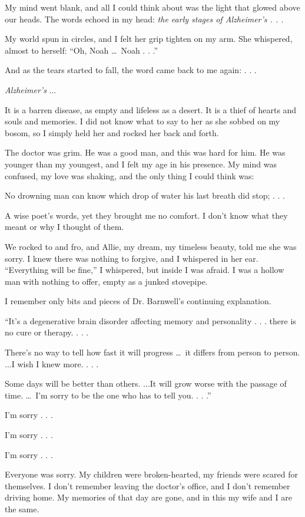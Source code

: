 \documentclass[10pt, twoside, openright]{book}
\begin{document}
My mind went blank, and all I could think about was the light that
glowed above our heads. The words echoed in my head: \emph{the early
stages of Alzheimer's . . .}

My world spun in circles, and I felt her grip tighten on my arm. She
whispered, almost to herself: ``Oh, Noah   \dots\ Noah . . .''


And as the tears started to fall, the word came back to me again: . . .


\emph{Alzheimer's} ...

It is a barren disease, as empty and lifeless as a desert. It is a thief
of hearts and souls and memories. I did not know what to say to her as
she sobbed on my bosom, so I simply held her and rocked her back and
forth.

The doctor was grim. He was a good man, and this was hard for him. He
was younger than my youngest, and I felt my age in his presence. My mind
was confused, my love was shaking, and the only thing I could think was:


No drowning man can know which drop of water his last breath did stop; .
. .


A wise poet's words, yet they brought me no comfort. I don't know what
they meant or why I thought of them.

We rocked to and fro, and Allie, my dream, my timeless beauty, told me
she was sorry. I knew there was nothing to forgive, and I whispered in
her ear. ``Everything will be fine,'' I whispered, but inside I was
afraid. I was a hollow man with nothing to offer, empty as a junked
stovepipe.

I remember only bits and pieces of Dr. Barnwell's continuing
explanation.

``It's a degenerative brain disorder affecting memory and personality .
. . there is no cure or therapy. . . .

There's no way to tell how fast it will progress   \dots\ it differs from
person to person. ...I wish I knew more. . . .

Some days will be better than others. ...It will grow worse with the
passage of time.   \dots\ I'm sorry to be the one who has to tell you. . .
.''


I'm sorry . . .

I'm sorry . . .

I'm sorry . . .


Everyone was sorry. My children were broken-hearted, my friends were
scared for themselves. I don't remember leaving the doctor's office, and
I don't remember driving home. My memories of that day are gone, and in
this my wife and I are the same.
\end{document}
